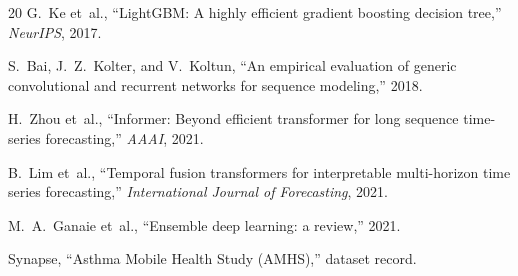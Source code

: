 \documentclass[11pt,a4paper]{article}
\begin{document}
\begin{thebibliography}{20}
G.~Ke et~al., ``LightGBM: A highly efficient gradient boosting decision
tree,'' \emph{NeurIPS}, 2017.

S.~Bai, J.~Z.~Kolter, and V.~Koltun, ``An empirical evaluation of generic
convolutional and recurrent networks for sequence modeling,'' 2018.

H.~Zhou et~al., ``Informer: Beyond efficient transformer for long sequence
time-series forecasting,'' \emph{AAAI}, 2021.

B.~Lim et~al., ``Temporal fusion transformers for interpretable multi-horizon
time series forecasting,'' \emph{International Journal of Forecasting}, 2021.

M.~A.~Ganaie et~al., ``Ensemble deep learning: a review,'' 2021.

Synapse, ``Asthma Mobile Health Study (AMHS),'' dataset record.

\end{thebibliography}
\end{document}
